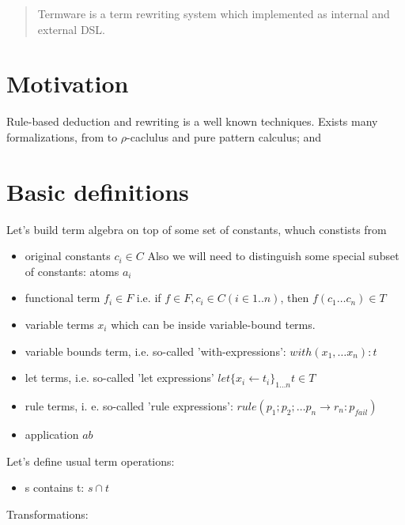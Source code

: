 \documentclass[12pt]{article}
\begin{document}
\maketitle

\begin{abstract}
 Termware is a term rewriting system which implemented as internal and external DSL.
\end{abstract}

\section{Motivation}

  Rule-based deduction and rewriting is a well known techniques. Exists many formalizations, from
   to $\rho$-caclulus and pure pattern calculus;  and 


  
  


\section{Basic definitions}

   Let's build term algebra on top of some set of constants, whuch constists from
\begin{itemize}
 \item original constants ${c_i} \in C$ Also we
 will need to distinguish some special subset of constants: atoms ${a_i}$
 \item functional term $f_i \in F$  i.e. if $f \in F, c_i \in C (i \in 1..n)$, then $f(c_{1} \dots c_{n}) \in T$
 \item variable terms $x_{i}$ which can be inside variable-bound terms.
 \item variable bounds term, i.e. so-called 'with-expressions': $with(x_1,\dots x_n):t$
 \item let terms, i.e. so-called 'let expressions' $let \{ x_i \leftarrow t_i \}_{1\dots n} t  \in T$
 \item rule terms, i. e. so-called 'rule expressions': 
       $rule(p_1 ; p_2 ; \dots p_n \to r_n : p_{fail})$
 \item application $a b$
\end{itemize}

  Let's define usual term operations:
  \begin{itemize}
    \item s contains t: $s \cap t$
  \end{itemize}

  Transformations:
\end{document}
